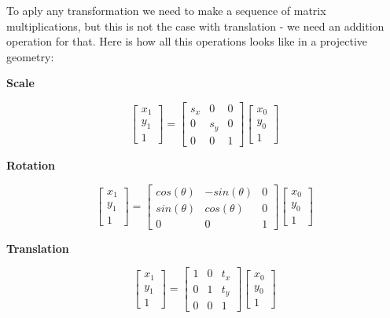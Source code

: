 To aply any transformation we need to make a sequence of matrix multiplications, but this is not the case with translation - we need an addition operation for that. Here is how all this operations looks like in a projective geometry:

\begin{center}
    \textbf{Scale}
\end{center}
$$
\begin{bmatrix}
    x_1 \\ y_1 \\ 1
\end{bmatrix} = 
\begin{bmatrix}
    s_x & 0 & 0\\
    0 & s_y & 0\\
    0 & 0 & 1
\end{bmatrix}
\begin{bmatrix}
    x_0 \\ y_0 \\ 1
\end{bmatrix}
$$ 
\begin{center}
    \textbf{Rotation}    
\end{center}
$$
\begin{bmatrix}
    x_1 \\ y_1 \\ 1
\end{bmatrix} = 
\begin{bmatrix}
    cos(\theta) & -sin(\theta) & 0 \\
    sin(\theta) & cos(\theta)  & 0 \\
    0 & 0 & 1
\end{bmatrix}
\begin{bmatrix}
    x_0 \\ y_0 \\ 1
\end{bmatrix}
$$
\begin{center}
    \textbf{Translation}    
\end{center}
$$
\begin{bmatrix}
    x_1 \\ y_1 \\ 1
\end{bmatrix} = 
\begin{bmatrix}
    1 & 0 & t_x\\
    0 & 1 & t_y\\
    0 & 0 & 1
\end{bmatrix}
\begin{bmatrix}
    x_0 \\ y_0 \\ 1
\end{bmatrix}
$$ 

